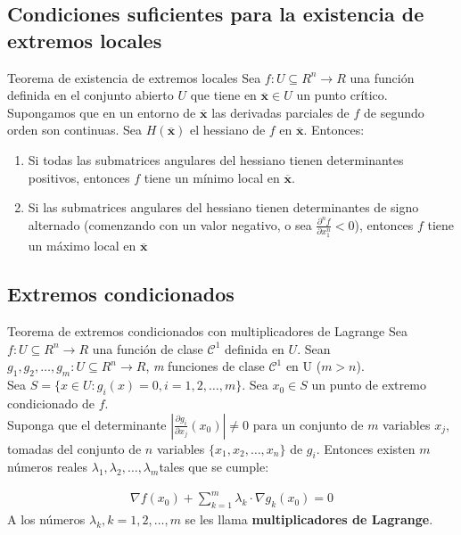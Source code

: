\documentclass[a4paper, twoside]{article}
\numberwithin{equation}{section}
\numberwithin{figure}{section}
\numberwithin{table}{section}
\newcommand{\vect}[1]{\overline{\textbf{#1}}}
\begin{document}
\subsection{Condiciones suficientes para la existencia de extremos locales}
\begin{teorema*}{Teorema de existencia de extremos locales}
	Sea $f:U\subseteq R^n \to R$ una función definida en el conjunto abierto $U$ que tiene en $\vect{x}\in U$ un punto crítico. Supongamos que en un entorno de $\vect{x}$ las derivadas parciales de $f$ de segundo orden son continuas. Sea $H(\vect{x})$ el hessiano de $f$ en $\vect{x}$. Entonces:
	\begin{enumerate}
		\item Si todas las submatrices angulares del hessiano tienen determinantes positivos, entonces $f$ tiene un mínimo local en $\vect{x}$.
		\item Si las submatrices angulares del hessiano tienen determinantes de signo alternado (comenzando con un valor negativo, o sea $\frac{\partial^n f}{\partial x_1^n}<0$), entonces $f$ tiene un máximo local en $\vect{x}$
	\end{enumerate}
\end{teorema*}

\subsection{Extremos condicionados}
\begin{teorema*}{Teorema de extremos condicionados con multiplicadores de Lagrange}
	Sea $f: U \subseteq R^n \to R$ una función de clase $\mathcal{C}^{1}$ definida en $U$. Sean $g_1,g_2,\ldots,g_m: U \subseteq R^n \to R$, \textit{m} funciones de clase $\mathcal{C}^{1}$ en U ($m>n$).\\
	
	Sea $S=\{x\in U:g_i (x)=0,i=1,2,\ldots,m\}$. Sea $x_0 \in S$ un punto de extremo condicionado de $f$.\\
	
	Suponga que el determinante $\left|\frac{\partial g_i}{\partial x_j}(x_0)\right|\ne0$ para un conjunto de $m$ variables $x_j$, tomadas del conjunto de $n$ variables $\{ x_1,x_2,\ldots,x_n\} $ de $g_i$. Entonces existen $m$ números reales $\lambda_1,\lambda_2,\ldots,\lambda_m$tales que se cumple:
	
	\begin{align}
		\nabla f(x_0)+\sum_{k=1}^{m}\lambda_k \cdot \nabla g_k (x_0)=0
	\end{align}
	A los números $\lambda_{k},k=1,2,\ldots,m$ se les llama \textbf{multiplicadores de Lagrange}.
\end{teorema*}
\end{document}
